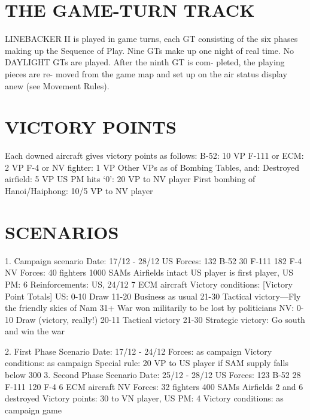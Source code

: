\section*{THE GAME-TURN TRACK}
LINEBACKER II is played in game
turns, each GT consisting of the six
phases making up the Sequence of
Play. Nine GTs make up one night of
real time. No DAYLIGHT GTs are
played. After the ninth GT is com-
pleted, the playing pieces are re-
moved from the game map and set up
on the air status display anew (see
Movement Rules).
\section*{VICTORY POINTS}
Each downed aircraft gives victory
points as follows:
B-52: 10 VP
F-111 or ECM: 2 VP
F-4 or NV fighter: 1 VP
Other VPs as of Bombing Tables,
and:
Destroyed airfield: 5 VP
US PM hits ‘0’: 20 VP to NV player
First bombing of Hanoi/Haiphong:
10/5 VP to NV player

\section*{SCENARIOS}
1. Campaign scenario
Date: 17/12 - 28/12
US Forces:
132 B-52
30 F-111
182 F-4
NV Forces:
40 fighters
1000 SAMs
Airfields intact
US player is first player, US PM: 6
Reinforcements: US, 24/12 7 ECM
aircraft
Victory conditions:
[Victory Point Totals]
US:
0-10 Draw
11-20 Business as usual
21-30 Tactical victory—Fly the
friendly skies of Nam
31+ War won militarily to be lost
by politicians
NV:
0-10 Draw (victory, really!)
20-11 Tactical victory
21-30 Strategic victory: Go south and
win the war

2. First Phase Scenario
Date: 17/12 - 24/12
Forces: as campaign
Victory conditions: as campaign
Special rule: 20 VP to US player if
SAM supply falls below 300
3. Second Phase Scenario
Date: 25/12 - 28/12
US Forces:
123 B-52
28 F-111
120 F-4
6 ECM aircraft
NV Forces:
32 fighters
400 SAMs
Airfields 2 and 6 destroyed
Victory points: 30 to VN player,
US PM: 4
Victory conditions: as campaign game

